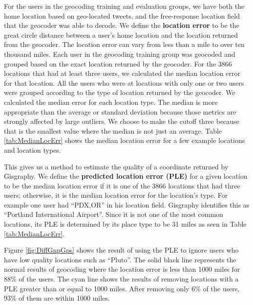 For the users in the geocoding training and evaluation groups, we have both the
home location based on geo-located tweets, and the free-response location field
that the geocoder was able to decode.
We define the \textbf{location error} to be the great circle distance between a user's home
location and the location returned from the geocoder.
The location error can vary from less than a mile to over ten thousand miles.
Each user in the geocoding training group was geocoded and grouped based on the exact location returned by the geocoder.
For the 3866 locations that had at least three users, we calculated the median location error for that location.
All the users who were at locations with only one or two users were grouped
according to the type of location returned by the geocoder.
We calculated the median error for each location type.
The median is more appropriate than the average or standard deviation because
those metrics are strongly affected by large outliers.
We choose to make the cutoff three because that is the smallest value where the median is not just an average.
Table \ref{tab:MedianLocErr} shows the median location error for a few example
locations and location types.

This gives us a method to estimate the quality of a coordinate returned by
Gisgraphy.
We define the \textbf{predicted location error (PLE)} for a given location to
be the median location error if it is one of the 3866 locations that had three
users; otherwise, it is the median location error for the location's type.
For example one user had ``PDX,OR'' in his location field. Gisgraphy identifies
this as ``Portland International Airport''. Since it is not one of the most
common locations, its PLE is determined by its place type to be 31 miles as
seen in Table \ref{tab:MedianLocErr}.

Figure \ref{fig:DiffGnpGps} shows the result of using the PLE to ignore users
who have low quality locations such as ``Pluto''.
The solid black line represents the normal results of geocoding where the
location error is less than 1000 miles for 88\% of the users.
The cyan line shows the results of removing locations with a PLE greater than
or equal to 1000 miles.
After removing only 6\% of the users, 93\% of them are within 1000 miles.
